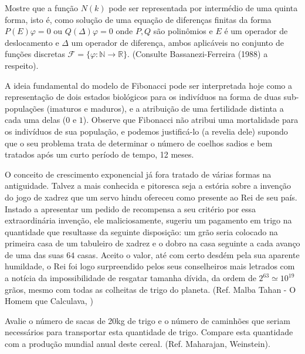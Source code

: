 \begin{exercise}
Mostre que a função \(N(k)\) pode ser representada por intermédio de uma quinta forma, isto é, como solução de uma equação de diferenças finitas da forma \(P(E) \varphi = 0\) ou \(Q(\Delta) \varphi = 0\) onde \(P, Q\) são polinômios e \(E\) é um operador de deslocamento e \(\Delta\) um operador de diferença, ambos aplicáveis no conjunto de funções discretas \(\mathcal{F} = \{\varphi: \mathbb{N} \to \mathbb{R}\}\). (Consulte Bassanezi-Ferreira (1988) a respeito).
\end{exercise}


    A ideia fundamental do modelo de Fibonacci pode ser interpretada hoje como a representação de dois estados biológicos para os indivíduos na forma de duas sub-populações (imaturos e maduros), e a atribuição de uma fertilidade distinta a cada uma delas (\(0\) e \(1\)). Observe que Fibonacci não atribui uma mortalidade para os indivíduos de sua população, e podemos justificá-lo (a revelia dele) supondo que o seu problema trata de determinar o número de coelhos sadios e bem tratados após um curto período de tempo, 12 meses.

    O conceito de crescimento exponencial já fora tratado de várias formas na antiguidade. Talvez a mais conhecida e pitoresca seja a estória sobre a invenção do jogo de xadrez que um servo hindu ofereceu como presente ao Rei de seu país. Instado a apresentar um pedido de recompensa a seu critério por essa extraordinária invenção, ele maliciosamente, sugeriu um pagamento em trigo na quantidade que resultasse da seguinte disposição: um grão seria colocado na primeira casa de um tabuleiro de xadrez e o dobro na casa seguinte a cada avanço de uma das suas \(64\) casas. Aceito o valor, até com certo desdém pela sua aparente humildade, o Rei foi logo surpreendido pelos seus conselheiros mais letrados com a notícia da impossibilidade de resgatar tamanha dívida, da ordem de \(2^{63} \simeq 10^{19}\) grãos, mesmo com todas as colheitas de trigo do planeta. (Ref. Malba Tahan - O Homem que Calculava, )

\begin{exercise}
    Avalie o número de sacas de 20kg de trigo e o número de caminhões que seriam necessários para transportar esta quantidade de trigo. Compare esta quantidade com a produção mundial anual deste cereal. (Ref. Maharajan, Weinstein).
\end{exercise}

